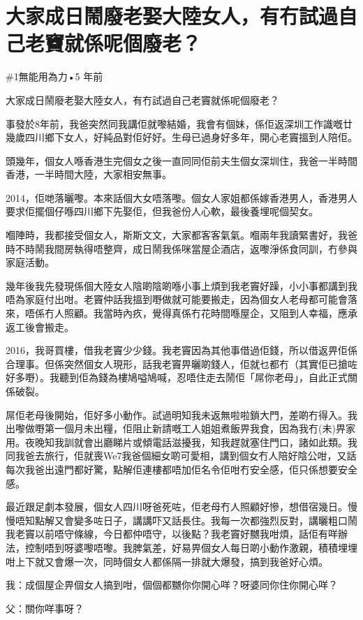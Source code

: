 \chapter{大家成日鬧廢老娶大陸女人，有冇試過自己老竇就係呢個廢老？}

\#1無能用為力•5 年前

大家成日鬧廢老娶大陸女人，有冇試過自己老竇就係呢個廢老？

事發於8年前，我爸突然同我講佢就嚟結婚，我會有個妹，係佢返深圳工作識嘅廿幾歲四川鄉下女人，好純品對佢好好。生母已過身好多年，開心老竇搵到人陪佢。

頭幾年，個女人喺香港生完個女之後一直同同佢前夫生個女深圳住，我爸一半時間香港，一半時間大陸，大家相安無事。

2014，佢哋落曬嚟。本來話個大女唔落嚟。個女人家姐都係嫁香港男人，香港男人要求佢擺個仔喺四川鄉下先娶佢，但我爸份人心軟，最後養埋呢個契女。

嗰陣時，我都接受個女人，斯斯文文，大家都客客氣氣。嗰兩年我讀緊書好，我爸時不時鬧我間房執得唔整齊，成日鬧我係咪當屋企酒店，返嚟淨係食同訓，冇參與家庭活動。

幾年後我先發現係個大陸女人陰啲陰啲喺小事上煩到我老竇好躁，小小事都講到我唔為家庭付出咁。老竇仲話我搵到嘢做就可能要搬走，因為個女人老母都可能會落來，唔係冇人照顧。我當時內疚，覺得真係冇花時間喺屋企，又阻到人幸福，應承返工後會搬走。

2016，我哥買樓，借我老竇少少錢。我老竇因為其他事借過佢錢，所以借返畀佢係合理事。但係突然個女人現形，話我老竇畀曬啲錢人，佢就乜都冇（其實佢已搶咗好多嘢）。我聽到佢為錢為樓鳩嗌鳩喊，忍唔住走去鬧佢「屌你老母」，自此正式關係破裂。

屌佢老母後開始，佢好多小動作。試過明知我未返無啦啦鎖大門，差啲冇得入。我出嚟做嘢第一個月未出糧，佢阻止新請嘅工人姐姐煮飯畀我食，因為我冇(未)畀家用。夜晚知我訓就會出廳睇片或傾電話滋擾我，知我趕就塞住門口，諸如此類。我同我爸去旅行，佢就喪We7我爸個細女啲可愛相，講到個女冇人陪好陰公咁，又話每次我爸出遠門都好驚，點解佢連樓都唔加佢名令佢咁冇安全感，佢只係想要安全感。

最近跟足劇本發展，個女人四川呀爸死咗，佢老母冇人照顧好慘，想借宿幾日。慢慢唔知點解又會變多咗日子，講講吓又話長住。我每一次都強烈反對，講曬粗口鬧我老竇以前唔守條線，今日都仲唔守，以後點？我老竇好嬲我咁煩，話佢有咩辦法，控制唔到呀婆嚟唔嚟。我脾氣差，好易畀個女人每日啲小動作激親，積積埋埋咁上下就又會爆一次，同時個女人都係隔一排就大爆發，搞到我爸好心煩。

我：成個屋企畀個女人搞到咁，個個都嬲你你開心咩？呀婆同你住你開心咩？

父：關你咩事呀？

